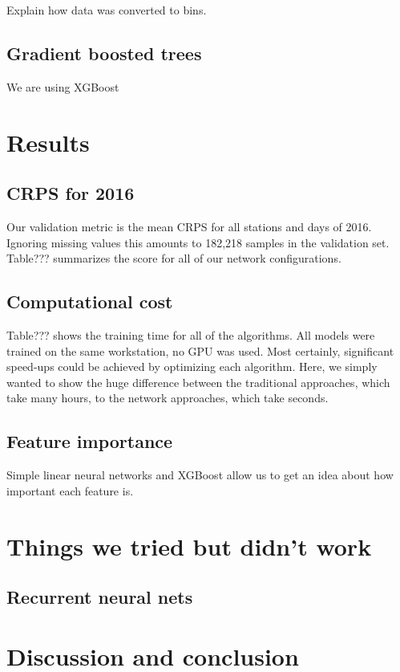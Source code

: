 \documentclass[a4paper,10pt]{scrartcl}
\begin{document}
Explain how data was converted to bins.

\subsection{Gradient boosted trees}

We are using XGBoost



\section{Results}
\label{sec:results}

\subsection{CRPS for 2016}
Our validation metric is the mean CRPS for all stations and days of 2016. Ignoring missing values this amounts to 182,218 samples in the validation set. Table??? summarizes the score for all of our network configurations. 

\subsection{Computational cost}
Table??? shows the training time for all of the algorithms. All models were trained on the same workstation, no GPU was used. Most certainly, significant speed-ups could be achieved by optimizing each algorithm. Here, we simply wanted to show the huge difference between the traditional approaches, which take many hours, to the network approaches, which take seconds. 

\subsection{Feature importance}
Simple linear neural networks and XGBoost allow us to get an idea about how important each feature is.

\section{Things we tried but didn't work}

\subsection{Recurrent neural nets}


\section{Discussion and conclusion}



\end{document}

